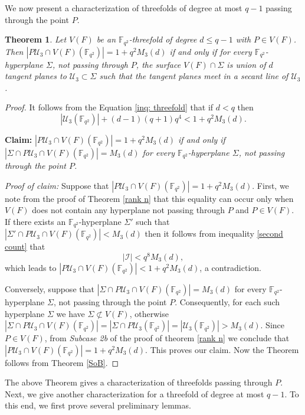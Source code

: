 \documentclass[10pt,a4paper,oneside]{amsproc}
\newtheorem{theorem}{Theorem}[section]
\newcommand{\Fqt}{\mathbb{F}_{q^2}}
\newcommand{\I}{\mathcal{I}}
\newcommand{\U}{\mathcal{U}}
\begin{document}
We now present a characterization of threefolds of degree at most $q-1$ passing through the point $P$.
\begin{theorem}\label{weak condition}
  Let $V(F)$ be an $\Fqt$-threefold of degree $d\leq q-1$ with $P\in V(F)$. Then $|P\U_3\cap V(F)(\Fqt)|= 1+q^2M_3(d)$ if and only if for every $\Fqt$-hyperplane $\Sigma$, not passing through $P$, the surface $V(F)\cap \Sigma$ is union of $d$ tangent planes to $\U_3\subset \Sigma$ such that the tangent planes meet in a secant line of $\U_3$.
\end{theorem}
\begin{proof}
 It follows from the Equation \eqref{inq: threefold} that if $d<q$ then $$|\U_3(\Fqt)|+(d-1)(q+1)q^4< 1+q^2M_3(d).$$
 
 \textbf{Claim:} \textit{$|P\U_3\cap V(F)(\Fqt)|= 1+q^2M_3(d)$ if and only if $|\Sigma\cap P\U_3\cap V(F)(\Fqt)|=M_3(d)$ for every $\Fqt$-hyperplane $\Sigma$, not passing through the point $P$.}

 \textit{Proof of claim:} Suppose that $|P\U_3\cap V(F)(\Fqt)|= 1+q^2M_3(d)$. First, we note from the proof of Theorem \ref{rank n} that this equality can occur only when $V(F)$ does not contain any hyperplane not passing through $P$ and $P\in V(F)$. If there exists an $\Fqt$-hyperplane $\Sigma'$ such that $|\Sigma'\cap P\U_3\cap V(F)(\Fqt)|<M_3(d)$ then it follows from inequality \eqref{second count} that $$|\I|<q^8M_3(d),$$ which leads to $|P\U_3\cap V(F)(\Fqt)|<1+q^2M_3(d)$, a contradiction.

 Conversely, suppose that $|\Sigma\cap P\U_3\cap V(F)(\Fqt)|=M_3(d)$ for every $\Fqt$-hyperplane $\Sigma$, not passing through the point $P$. Consequently, for each such hyperplane $\Sigma$ we have $\Sigma \not\subset V(F)$, otherwise $|\Sigma\cap P\U_3\cap V(F)(\Fqt)|=|\Sigma\cap P\U_3(\Fqt)|=|\U_3(\Fqt)|> M_3(d)$. Since $P\in V(F)$, from \textit{Subcase 2b} of the proof of theorem \ref{rank n} we conclude that $|P\U_3\cap V(F)(\Fqt)|=1+q^2M_3(d)$. This proves our claim. Now the Theorem follows from Theorem \ref{SoB}. 
    
\end{proof}

The above Theorem gives a characterization of threefolds passing through $P$. Next, we give another characterization for a threefold of degree at most $q-1$. To this end, we first prove several preliminary lemmas.
\end{document}
